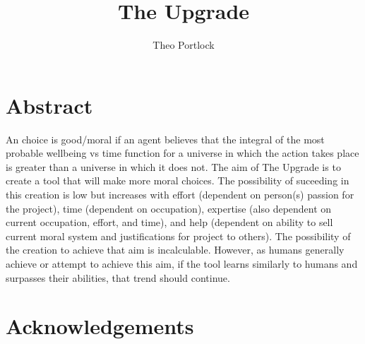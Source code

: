 \documentclass[12pt]{book}
\title{The Upgrade}
\author{Theo Portlock}
\begin{document}
\frontmatter
\maketitle

\chapter{Abstract}
An choice is good/moral if an agent believes that the integral of the most probable wellbeing vs time function for a universe in which the action takes place is greater than a universe in which it does not. The aim of The Upgrade is to create a tool that will make more moral choices. The possibility of suceeding in this creation is low but increases with effort (dependent on person(s) passion for the project), time (dependent on occupation), expertise (also dependent on current occupation, effort, and time), and help (dependent on ability to sell current moral system and justifications for project to others). The possibility of the creation to achieve that aim is incalculable. However, as humans generally achieve or attempt to achieve this aim, if the tool learns similarly to humans and surpasses their abilities, that trend should continue.

\cleardoublepage
{}
{}
\dominitoc
\tableofcontents

\cleardoublepage
{}
{}
\singlespacing
\glsfindwidesttoplevelname
\printglossary[title={Abbreviations},style=alttree]
\doublespacing

\cleardoublepage
{}
{}
\listoffigures

\cleardoublepage
{}
{}
\listoftables

\mainmatter
\setcounter{mtc}{5}

\setcounter{mtc}{6}

\setcounter{mtc}{7}

\setcounter{mtc}{8}

\setcounter{mtc}{9}

\setcounter{mtc}{10}

\setcounter{mtc}{11}


\backmatter


\chapter{Acknowledgements}


\end{document}
